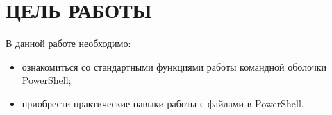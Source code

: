 \section{ЦЕЛЬ РАБОТЫ}

В данной работе необходимо:

\begin{itemize}
\item ознакомиться со стандартными функциями работы командной оболочки PowerShell;
\item приобрести практические навыки работы с файлами в PowerShell.
\end{itemize}

\newpage

